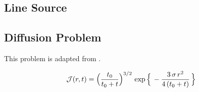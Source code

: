 \documentclass[10pt,preprint]{aastex}
\begin{document}
\subsection{Line Source}

\subsection{Diffusion Problem}

This problem is adapted from \citet{abdikamalov_etal_2012} \citep[see also][]{pons_etal_2000,sumiyoshiYamada_2012}.  

\begin{equation}
  \mathcal{J}(r,t)=\Big(\frac{t_{0}}{t_{0}+t}\Big)^{3/2}\,\exp\Big\{\,-\frac{3\,\sigma\,r^{2}}{4\,(t_{0}+t)}\,\Big\}
\end{equation}
\end{document}
